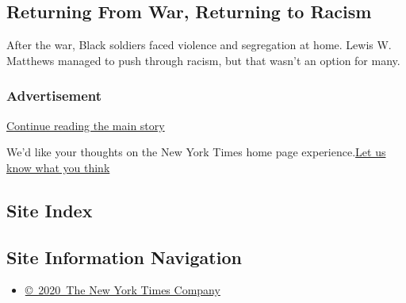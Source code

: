 \href{/2020/08/04/books/review/a-furious-sky-hurricanes-eric-jay-dolan.html}{}

\href{/2020/07/30/magazine/black-soldiers-wwii-racism.html}{}

\hypertarget{returning-from-war-returning-to-racism}{%
\subsection{Returning From War, Returning to
Racism}\label{returning-from-war-returning-to-racism}}

After the war, Black soldiers faced violence and segregation at home.
Lewis W. Matthews managed to push through racism, but that wasn't an
option for many.

\href{/2020/07/30/magazine/black-soldiers-wwii-racism.html}{}

\hypertarget{advertisement}{%
\subsubsection{Advertisement}\label{advertisement}}

\protect\hyperlink{after-dfp-ad-mid1-large}{Continue reading the main
story}

We'd like your thoughts on the New York Times home page
experience.\href{http://nyt.qualtrics.com/jfe/form/SV_eFJmKj9v0krSE0l}{Let
us know what you think}

\hypertarget{site-index}{%
\subsection{Site Index}\label{site-index}}

\hypertarget{site-information-navigation}{%
\subsection{Site Information
Navigation}\label{site-information-navigation}}

\begin{itemize}
\tightlist
\item
  \href{https://help.nytimes.com/hc/en-us/articles/115014792127-Copyright-notice}{©~2020~The
  New York Times Company}
\end{itemize}

